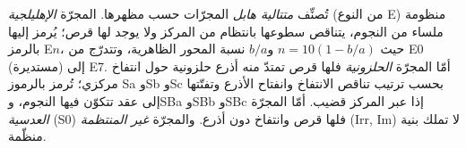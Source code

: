 \begin{definition}\label{def:b3:milky-way-galaxies:types}
تُصنِّف \emph{متتالية هابل} المجرّات حسب
مظهرها. المجرّة \emph{الإهليلجية}
(من النوع E) منظومة ملساء من النجوم، يتناقص سطوعها بانتظام من المركز ولا يوجد لها قرص؛
يُرمز إليها بالرمز E$n$، حيث $n = 10(1 - b/a)$ و$b/a$ نسبة المحور الظاهرية،
وتتدرّج من E0 (مستديرة) إلى E7. أمّا
المجرّة \emph{الحلزونية} فلها قرص تمتدّ منه أذرع حلزونية حول انتفاخ مركزي؛
تُرمز بالرموز Sa وSb وSc بحسب ترتيب تناقص الانتفاخ
وانفتاح الأذرع وتفتّتها إلى عقد تتكوّن فيها النجوم،
وSBa وSBb وSBc إذا عبر المركز قضيب. أمّا المجرّة
\emph{العدسية} (S0) فلها قرص وانتفاخ دون أذرع.
والمجرّة \emph{غير المنتظمة} (Irr, Im)
لا تملك بنية منظّمة.
\end{definition}

